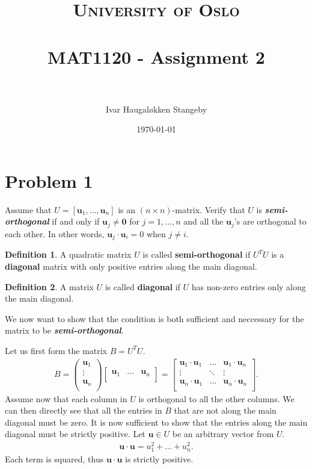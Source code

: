\documentclass[paper=a4, fontsize=11pt]{scrartcl} %
\title{	
  \normalfont \normalsize
  \textsc{University of Oslo} \\ [25pt] %
  \horrule{0.5pt} \\[0.4cm] %
  \huge MAT1120 - Assignment 2 \\ %
  \horrule{2pt} \\[0.5cm] %
}
\author{Ivar Haugaløkken Stangeby} %
\date{\normalsize\today} %
\numberwithin{equation}{section} %
\numberwithin{figure}{section} %
\numberwithin{table}{section} %
\theoremstyle{definition}
\newtheorem*{definition}{Definition}
\begin{document}
\maketitle %
\section*{Problem 1}
Assume that $U = \left[ \mathbf{u}_1,\dots,\mathbf{u}_n \right]$ is an $\left(n \times n\right)$-matrix.
Verify that $U$ is \textbf{\textit{semi-orthogonal}} if and only if $\mathbf{u}_j \neq \mathbf{0}$ for $j=1,\dots,n$ and all the $\mathbf{u}_j$'s are orthogonal
to each other. In other words, $\mathbf{u}_j \cdot \mathbf{u}_i = 0$ when $j \neq i$.

\begin{definition}
  A quadratic matrix $U$ is called \textbf{semi-orthogonal} if $U^TU$ is a \textbf{diagonal} matrix with only positive entries along the
  main diagonal.
\end{definition}
\begin{definition}
	A matrix $U$ is called \textbf{diagonal} if $U$ has non-zero entries only along the
	main diagonal.
\end{definition}
We now want to show that the condition is both sufficient and neccessary for the matrix to be \textbf{\textit{semi-orthogonal}}.

Let us first form the matrix $B = U^TU$.
\begin{align*}
  B = \begin{pmatrix}
	\mathbf{u}_1 \\
	\vdots \\
	\mathbf{u}_n\\
  \end{pmatrix} \begin{bmatrix}
	\mathbf{u}_1 & \hdots & \mathbf{u}_n\\
  \end{bmatrix} = \begin{bmatrix}
	\mathbf{u}_1 \cdot \mathbf{u}_1 & \hdots & \mathbf{u}_1\cdot\mathbf{u}_n \\
	\vdots & \ddots & \vdots \\
	\mathbf{u}_n \cdot \mathbf{u}_1 & \hdots & \mathbf{u}_n\cdot\mathbf{u}_n\\
  \end{bmatrix}.
\end{align*}
Assume now that each column in $U$ is orthogonal to all the other columns. We can then directly see that all the entries in $B$ that are not
along the main diagonal must be zero. It is now sufficient to show that the entries along the main diagonal must be strictly positive.
Let $\mathbf{u} \in U$ be an arbitrary vector from $U$.
\begin{align*}
  \mathbf{u}\cdot\mathbf{u} = u_1^2 + \dots + u_n^2.
\end{align*}
Each term is squared, thus $\mathbf{u}\cdot\mathbf{u}$ is strictly positive.
\end{document}
